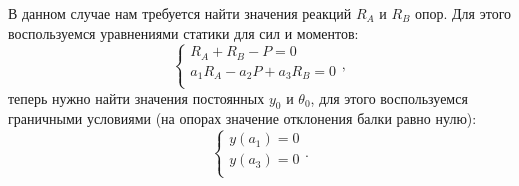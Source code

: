 \documentclass[12pt, a4paper]{article}
\begin{document}
    В данном случае нам требуется найти значения реакций $R_{A}$ и $R_{B}$ опор. Для этого воспользуемся уравнениями статики для сил и моментов:
    \begin{equation}
        \begin{cases}
            R_{A} + R_{B} - P = 0 \\
            a_{1} R_{A} - a_{2} P + a_{3} R_{B} = 0 \\
        \end{cases},
        \label{eq4}
    \end{equation}
    теперь нужно найти значения постоянных $y_{0}$ и $\theta_{0}$, для этого воспользуемся граничными условиями (на опорах значение отклонения балки равно нулю):
    \begin{equation}
        \begin{cases}
            y(a_{1}) = 0 \\
            y(a_{3}) = 0 \\
        \end{cases}.
        \label{eq5}
    \end{equation}
    
\end{document}
